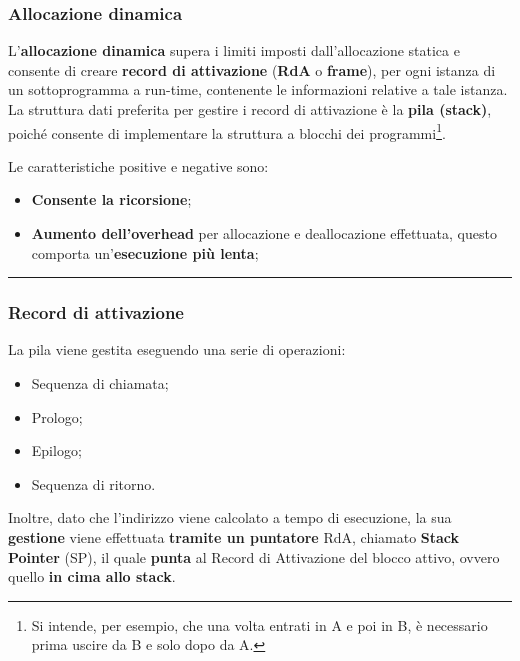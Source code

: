 \documentclass[a4paper]{article}
\newcommand{\longline}{\noindent\rule{\textwidth}{0.4pt}}
\begin{document}
 	\subsubsection{Allocazione dinamica}
 	L'\textbf{allocazione dinamica} supera i limiti imposti dall'allocazione statica e consente di creare \textcolor{Red3}{\textbf{record di attivazione}} (\textbf{RdA} o \textbf{frame}), per ogni istanza di un sottoprogramma a run-time, contenente le informazioni relative a tale istanza. La struttura dati preferita per gestire i record di attivazione è la \textcolor{Red3}{\textbf{pila (stack)}}, poiché consente di implementare la struttura a blocchi dei programmi\footnote{Si intende, per esempio, che una volta entrati in A e poi in B, è necessario prima uscire da B e solo dopo da A.}.\newline
 	
 	\noindent
 	Le caratteristiche positive e negative sono:
 	\begin{itemize}
 		\item \textbf{Consente la ricorsione};
 		\item \textbf{Aumento dell'overhead} per allocazione e deallocazione effettuata, questo comporta un'\textbf{esecuzione più lenta};
 	\end{itemize}
 	
 	\longline
 	
 	\subsubsection{Record di attivazione}
 	
 	La pila viene gestita eseguendo una serie di operazioni:
 	\begin{itemize}
 		\item Sequenza di chiamata;
 		\item Prologo;
 		\item Epilogo;
 		\item Sequenza di ritorno.
 	\end{itemize}
 	Inoltre, dato che l'indirizzo viene calcolato a tempo di esecuzione, la sua \textbf{gestione} viene effettuata \textbf{tramite un puntatore} RdA, chiamato \textbf{Stack Pointer} (SP), il quale \textbf{punta} al Record di Attivazione del blocco attivo, ovvero quello \textbf{in cima allo stack}.\newline
 	
\end{document}
